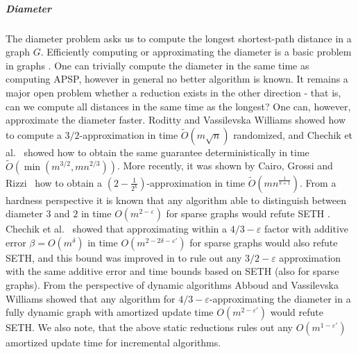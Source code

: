 \documentclass[a4paper,11pt]{article}
\newcommand{\eps}{\varepsilon}
\newcommand{\Ot}{\tilde{O}}
\theoremstyle{definition}
\begin{document}
\subparagraph*{Diameter}
The diameter problem asks us to compute the longest shortest-path distance in a
graph $G$. Efficiently computing or approximating the diameter is a basic
problem in graphs
\cite{AbboudGV15,AingworthCIM99,ChechikLRSTW14,CyganGS15,RodittyW13}. One can
trivially compute the diameter in the same time as computing APSP, however in
general no
better algorithm is known. It remains a major open problem whether a reduction
exists in the other direction \cite{AbboudGV15} - that is, can we compute all
distances in the same time as the longest? One can, however, approximate the
diameter faster. Roditty and Vassilevska Williams \cite{RodittyW13} showed how
to compute a $3/2$-approximation in time $\Ot(m\sqrt{n})$ randomized, and
Chechik et al.~\cite{ChechikLRSTW14} showed how to obtain the same guarantee
deterministically in time $\Ot(\min(m^{3/2},mn^{2/3}))$. More recently, it was
shown by Cairo, Grossi and Rizzi~\cite{CairoGR16} how to obtain a $(2 -
\frac{1}{2^k})$-approximation in time $\Ot(mn^{\frac{1}{k+1}})$. From a
hardness perspective it is known that any algorithm able to distinguish between
diameter $3$ and $2$ in time $O(m^{2-\eps})$ for sparse graphs would refute
SETH \cite{RodittyW13}. Chechik et al.~\cite{ChechikLRSTW14} showed that
approximating within a $4/3-\eps$ factor with additive error $\beta =
O(m^\delta)$ in time $O(m^{2-2\delta-\eps'})$ for sparse graphs would also
refute SETH, and this bound was improved in \cite{CairoGR16} to rule out any
$3/2-\eps$ approximation with the same additive error and time bounds based on
SETH (also for sparse graphs). From the perspective of dynamic algorithms
Abboud and Vassilevska Williams \cite{AbboudV14} showed that any algorithm for
$4/3-\eps$-approximating the diameter in a fully dynamic graph with amortized
update time $O(m^{2-\eps'})$ would refute SETH. We also note, that the above
static reductions rules out any $O(m^{1-\eps'})$ amortized update time for
incremental algorithms.
\end{document}
